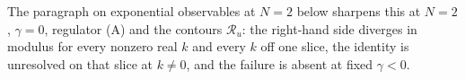 The paragraph on exponential observables at \(N=2\) below sharpens this at \(N=2\), \(\gamma=0\), regulator (A) and the contours \(\mathcal R_u\): the right-hand side diverges in modulus for every nonzero real \(k\) and every \(k\) off one slice, the identity is unresolved on that slice at \(k\ne0\), and the failure is absent at fixed \(\gamma<0\).
